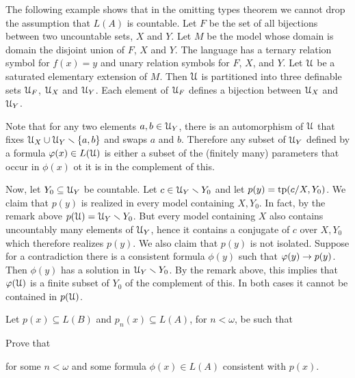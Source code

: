 \begin{example}\label{ex_AK}
The following example shows that in the omitting types theorem we cannot drop the assumption that $L(A)$ is countable.
Let $F$ be the set of all bijections between two uncountable sets, $X$ and $Y$.
Let $M$ be the model whose domain is domain the disjoint union of $F$, $X$ and $Y$.
The language has a ternary relation symbol for $f(x)=y$ and unary relation symbols for $F$, $X$, and $Y$.
Let $\EuScript U$ be a saturated elementary extension of $M$.
Then $\EuScript U$ is partitioned into three definable sets $\EuScript U_F$, $\EuScript U_X$ and $\EuScript U_Y$.
Each element of $\EuScript U_F$ defines a bijection between $\EuScript U_X$ and $\EuScript U_Y$.

Note that for any two elements $a,b\in\EuScript U_Y$, there is an automorphism of $\EuScript U$ that fixes $\EuScript U_X\cup\EuScript U_Y\smallsetminus\{a,b\}$ and swaps $a$ and $b$.
Therefore any subset of $\EuScript U_Y$ defined by a formula $\varphi(x)\in L(\EuScript U)$ is either a subset of the (finitely many) parameters that occur in $\phi(x)$ ot it is in the complement of this.

Now, let $Y_0\subseteq\EuScript U_Y$ be countable.
Let $c\in\EuScript U_Y\smallsetminus Y_0$ and let $p(y)={\rm tp}(c/X,Y_0)$.
We claim that $p(y)$ is realized in every model containing $X,Y_0$.
In fact, by the remark above $p(\EuScript U)=\EuScript U_Y\smallsetminus Y_0$.
But every model containing $X$ also contains uncountably many elements of $\EuScript U_Y$, hence it contains a conjugate of $c$ over $X, Y_0$ which therefore realizes $p(y)$.
We also claim that $p(y)$ is not isolated.
Suppose for a contradiction there is a consistent formula $\phi(y)$ such that $\varphi(y)\rightarrow p(y)$.
Then $\phi(y)$ has a solution in $\EuScript U_Y\smallsetminus Y_0$.
By the remark above, this implies that $\varphi(\EuScript U)$ is a finite subset of $Y_0$ of the complement of this.
In both cases it cannot be contained in $p(\EuScript U)$.
\end{example}

\begin{exercise}\label{ex_Baire}
Let $p(x)\subseteq L(B)$ and $p_n(x)\subseteq L(A)$, for $n<\omega$, be such that


Prove that 


for some $n<\omega$ and some formula $\phi(x)\in L(A)$ consistent with $p(x)$.
\end{exercise}

